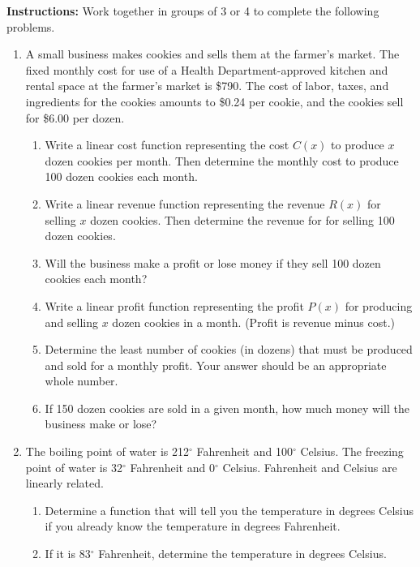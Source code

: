



\noindent \textbf{Instructions:}  Work together in groups of  3 or 4 to complete the following problems.




\begin{enumerate}

\item A small business makes cookies and sells them at the farmer's market.  The fixed monthly cost for use of a Health Department-approved kitchen and rental space at the farmer's market is \$790.  The cost of labor, taxes, and ingredients for the cookies amounts to \$0.24 per cookie, and the cookies sell for \$6.00 per dozen.
\begin{enumerate}
\item Write a linear cost function representing the cost $C(x)$ to produce $x$ dozen cookies per month.  Then determine the monthly cost to produce 100 dozen cookies each month.
\vfill
\item Write a linear revenue function representing the revenue $R(x)$ for selling $x$ dozen cookies.  Then determine the revenue for for selling 100 dozen cookies.
\vfill
\item Will the business make a profit or lose money if they sell 100 dozen cookies each month?
\vfill
\item Write a linear profit function representing the profit $P(x)$ for producing and selling $x$ dozen cookies in a month. (Profit is revenue minus cost.)
\vfill
\item Determine the least number of cookies (in dozens) that must be produced and sold for a monthly profit.  Your answer should be an appropriate whole number.
\vfill
\item If 150 dozen cookies are sold in a given month, how much money will the business make or lose?
\vfill
\end{enumerate}

\newpage

\item The boiling point of water is 212$^\circ$ Fahrenheit and 100$^\circ$ Celsius. The freezing point of water
 is 32$^\circ$ Fahrenheit and 0$^\circ$ Celsius. Fahrenheit and Celsius are linearly related.
 
 \begin{enumerate}
 \item Determine a function that will tell you the temperature in degrees Celsius if
you already know the temperature in degrees Fahrenheit.
\vfill
\vfill
 \item If it is 83$^\circ$ Fahrenheit, determine the temperature in degrees Celsius.
 \end{enumerate}
 \vfill
 

\end{enumerate}
